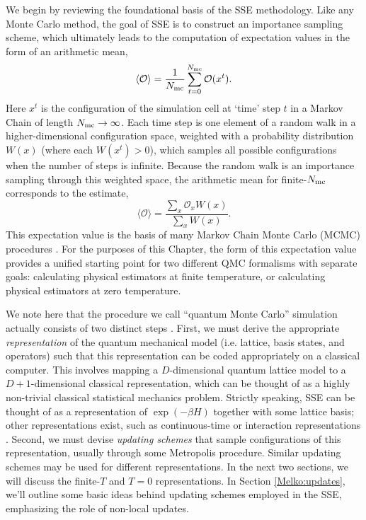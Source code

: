 \documentclass[vecphys]{svmult}
\begin{document}
We begin by reviewing the foundational basis of the SSE methodology.  Like any Monte Carlo method, the goal of SSE is to construct an importance sampling scheme, which ultimately leads to the computation of expectation values in the form of an arithmetic mean,
\begin{equation}
\langle \mathcal{O} \rangle  = \frac{1}{N_{\rm mc}} \sum_{t=0}^{N_{\rm mc}} \mathcal{O}(x^t). \label{Melko:est1}
\end{equation}
Here $x^t$ is the configuration of the simulation cell at \lq time' step $t$ in a Markov Chain of length $N_{\rm mc} \rightarrow \infty$.
Each time step is one element of a random walk in a higher-dimensional configuration space, weighted with a probability distribution $W(x)$ (where each $W(x^t) > 0$), which samples all possible configurations when the number of steps is infinite.
Because the random walk is an importance sampling through this weighted space, the arithmetic mean for finite-$N_{\rm mc}$ corresponds to the estimate,
\begin{equation}
\langle \mathcal{O} \rangle  = \frac{\sum_x \mathcal{O}_x  W(x)}{\sum_x W(x)}. \label{Melko:est2}
\end{equation}
This expectation value is the basis of many Markov Chain Monte Carlo (MCMC) procedures \cite{Melko:Liu}.
For the purposes of this Chapter, the form of this expectation value provides a unified starting point
for two different QMC formalisms with separate goals: calculating physical estimators at finite temperature, or calculating physical estimators at zero temperature.  

We note here that the procedure we call ``quantum Monte Carlo'' simulation actually consists of two distinct steps \cite{Melko:Assaad07}.  First, we must derive the appropriate {\it representation} of the quantum mechanical model (i.e. lattice, basis states, and operators) such that this representation can be coded appropriately on a classical computer.
This involves mapping a $D$-dimensional quantum lattice model to a $D+1$-dimensional classical representation, which can be thought of as a highly non-trivial classical statistical mechanics problem.
Strictly speaking, SSE can be thought of as a representation of $\exp(-\beta H)$ together with some lattice basis; other representations exist, such as continuous-time or interaction representations \cite{Melko:Assaad07}.
Second, we must devise {\it updating schemes} that sample configurations of this representation, usually through some Metropolis procedure.  Similar updating schemes may be used for different representations.
In the next two sections, we will discuss the finite-$T$ and $T=0$ representations.  In Section \ref{Melko:updates}, we'll outline some basic ideas behind updating schemes employed in the SSE, emphasizing the role of non-local updates.  
\end{document}
